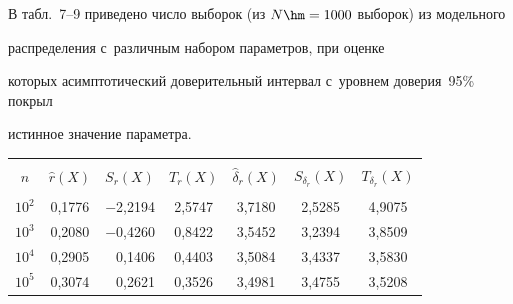 В табл.~7--9 приведено чис\-ло выборок (из $N\hm=1000$ выборок) из модельного 


распределения с~различным набором параметров, при оценке 


которых асимп\-то\-ти\-че\-ский доверительный интервал с~уров\-нем доверия~95\% по\-крыл 


истинное значение па\-ра\-метра.

















\begin{table}\small %


\begin{center}




\vspace*{2ex}





\tabcolsep=12pt


\begin{tabular}{|c|c|r|c|c|c|c|}


\hline


&&&&&&\\[-9pt]


$n$ & ${\hat r}(X)$& \multicolumn{1}{c|}{$S_r(X)$}& $T_r(X)$& ${\hat \delta}_r(X)$& 


$S_{\delta_r}(X)$& $T_{\delta_r}(X)$\\[2pt]


\hline


&&&&&&\\[-9pt]


 $10^2$& 0{,}1776& $-$2{,}2194& 2{,}5747& 3{,}7180& 2{,}5285& 4{,}9075\\


 $10^3$& 0{,}2080& $-$0{,}4260& 0{,}8422& 3{,}5452& 3{,}2394& 3{,}8509\\


 $10^4$& 0{,}2905& 0{,}1406& 0{,}4403& 3{,}5084& 3{,}4337& 3{,}5830\\


 $10^5$& 0{,}3074& 0{,}2621& 0{,}3526& 3{,}4981& 3{,}4755& 3{,}5208\\


\hline


\end{tabular}


\end{center}


\end{table}









